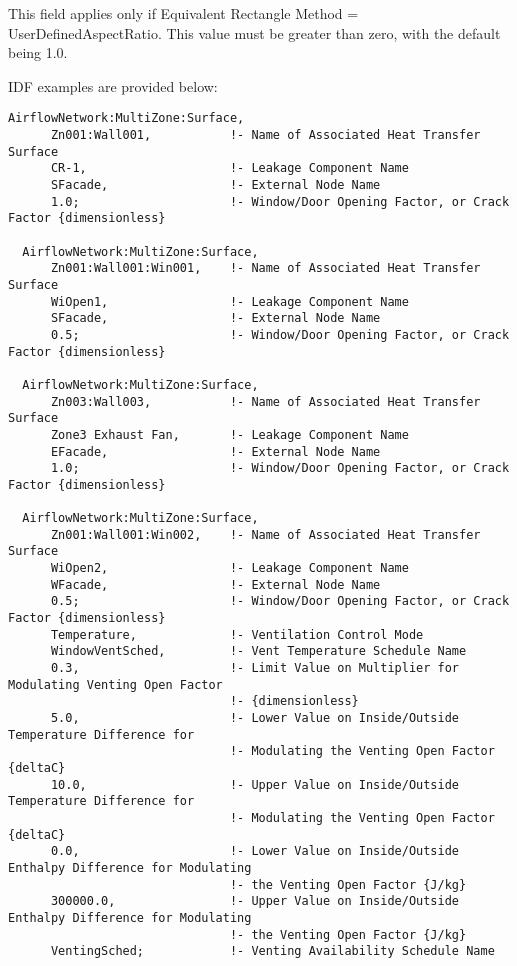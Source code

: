  This field applies only if Equivalent Rectangle Method = UserDefinedAspectRatio. This value must be greater than zero, with the default being 1.0.

IDF examples are provided below:

\begin{lstlisting}
AirflowNetwork:MultiZone:Surface,
      Zn001:Wall001,           !- Name of Associated Heat Transfer Surface
      CR-1,                    !- Leakage Component Name
      SFacade,                 !- External Node Name
      1.0;                     !- Window/Door Opening Factor, or Crack Factor {dimensionless}

  AirflowNetwork:MultiZone:Surface,
      Zn001:Wall001:Win001,    !- Name of Associated Heat Transfer Surface
      WiOpen1,                 !- Leakage Component Name
      SFacade,                 !- External Node Name
      0.5;                     !- Window/Door Opening Factor, or Crack Factor {dimensionless}

  AirflowNetwork:MultiZone:Surface,
      Zn003:Wall003,           !- Name of Associated Heat Transfer Surface
      Zone3 Exhaust Fan,       !- Leakage Component Name
      EFacade,                 !- External Node Name
      1.0;                     !- Window/Door Opening Factor, or Crack Factor {dimensionless}

  AirflowNetwork:MultiZone:Surface,
      Zn001:Wall001:Win002,    !- Name of Associated Heat Transfer Surface
      WiOpen2,                 !- Leakage Component Name
      WFacade,                 !- External Node Name
      0.5;                     !- Window/Door Opening Factor, or Crack Factor {dimensionless}
      Temperature,             !- Ventilation Control Mode
      WindowVentSched,         !- Vent Temperature Schedule Name
      0.3,                     !- Limit Value on Multiplier for Modulating Venting Open Factor
                               !- {dimensionless}
      5.0,                     !- Lower Value on Inside/Outside Temperature Difference for
                               !- Modulating the Venting Open Factor {deltaC}
      10.0,                    !- Upper Value on Inside/Outside Temperature Difference for
                               !- Modulating the Venting Open Factor {deltaC}
      0.0,                     !- Lower Value on Inside/Outside Enthalpy Difference for Modulating
                               !- the Venting Open Factor {J/kg}
      300000.0,                !- Upper Value on Inside/Outside Enthalpy Difference for Modulating
                               !- the Venting Open Factor {J/kg}
      VentingSched;            !- Venting Availability Schedule Name
\end{lstlisting}

